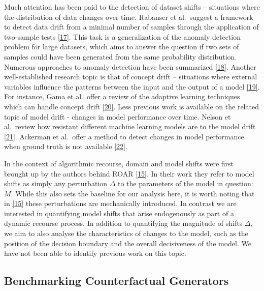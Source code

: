 \documentclass[
  conference]{IEEEtran}
\begin{document}
Much attention has been paid to the detection of dataset shifts --
situations where the distribution of data changes over time. Rabanser et
al.~suggest a framework to detect data drift from a minimal number of
samples through the application of two-sample tests
\protect\hyperlink{ref-rabanser2019failing}{{[}17{]}}. This task is a
generalization of the anomaly detection problem for large datasets,
which aims to answer the question if two sets of samples could have been
generated from the same probability distribution. Numerous approaches to
anomaly detection have been summarized
\protect\hyperlink{ref-chandola2009anomaly}{{[}18{]}}. Another
well-established research topic is that of concept drift -- situations
where external variables influence the patterns between the input and
the output of a model
\protect\hyperlink{ref-widmer1996learning}{{[}19{]}}. For instance, Gama
et al.~offer a review of the adaptive learning techniques which can
handle concept drift \protect\hyperlink{ref-gama2014survey}{{[}20{]}}.
Less previous work is available on the related topic of model drift -
changes in model performance over time. Nelson et al.~review how
resistant different machine learning models are to the model drift
\protect\hyperlink{ref-nelson2015evaluating}{{[}21{]}}. Ackerman et
al.~offer a method to detect changes in model performance when ground
truth is not available
\protect\hyperlink{ref-ackerman2021machine}{{[}22{]}}.

In the context of algorithmic recourse, domain and model shifts were
first brought up by the authors behind ROAR
\protect\hyperlink{ref-upadhyay2021towards}{{[}15{]}}. In their work
they refer to model shifts as simply any perturbation \(\Delta\) to the
parameters of the model in question: \(M\). While this also sets the
baseline for our analysis here, it is worth noting that in
\protect\hyperlink{ref-upadhyay2021towards}{{[}15{]}} these
perturbations are mechanically introduced. In contrast we are interested
in quantifying model shifts that arise endogenously as part of a dynamic
recourse process. In addition to quantifying the magnitude of shifts
\(\Delta\), we aim to also analyse the characteristics of changes to the
model, such as the position of the decision boundary and the overall
decisiveness of the model. We have not been able to identify previous
work on this topic.

\hypertarget{sec-related-benchmark}{%
\subsection{Benchmarking Counterfactual
Generators}\label{sec-related-benchmark}}
\end{document}
